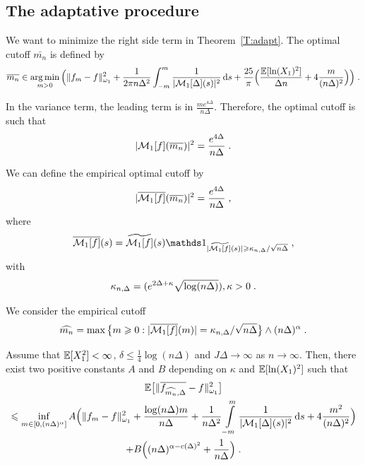 \subsection{The adaptative procedure}
\label{sec:mellin_adaptive}
We want to minimize the right side term in Theorem~\ref{T:adapt}. The optimal cutoff $\bar{m_n}$ is defined by 
\begin{equation*}
    \overline{m_n} \in \operatorname*{arg\,min}_{m > 0} \Big(\|f_m  - f \|_{\omega_1}^2 
    +
    \frac{1}{2\pi n \Delta^2} \int_{-m}^{m}\frac{1}{|\mathcal{M}_1[\Delta](s)|^2}\,\mathrm{d} s  \\
    + \frac{25}{\pi} \Big(\frac{\mathbb{E}[\ln(X_1)^2]}{\Delta n} + 4 \frac{m}{(n \Delta)^{2}} \Big) \Big)
    \; .
\end{equation*}


In the variance term, the leading term is in $\frac{m e^{4\Delta}}{n \Delta}$. Therefore, the optimal cutoff is such that
    \begin{equation*}
        |\mathcal{M}_1[f](\overline{m_n})|^2 = \frac{e^{4\Delta}}{n \Delta}
        \; .
    \end{equation*}

We can define the empirical optimal cutoff by 
    \begin{equation*}
        |\overline{\mathcal{M}_1[f]}(\overline{m_n})|^2 = \frac{e^{4\Delta}}{n \Delta}
        \; ,
    \end{equation*}
where 
\begin{equation*}
    \bar{\Mcal_1[f]}(s) = \tilde{\Mcal_1[f]}(s) \ind{|\tilde{\Mcal_1[f]}(s)| \geq \kappa_{n, \Delta} / \sqrt{n \Delta}}
    \eqfinv
\end{equation*}
with 
\begin{equation*}
    \kappa_{n, \Delta} = (e^{2\Delta + \kappa}\sqrt{\log(n \Delta)}), \kappa > 0
    \; .
\end{equation*}

We consider the empirical cutoff
\begin{equation*}
    \widehat{m_n} = \max \big\{ m \geqslant 0:  |\overline{\mathcal{M}_1[f]}(m)| = \kappa_{n, \Delta} / \sqrt{n \Delta} \big\} \wedge (n \Delta)^\alpha
    \; .
\end{equation*}

\begin{theorem}
\label{T:adapt}
Assume that $\mathbb{E}[X_1^2] < \infty$, $\delta \leq \frac{1}{4} \log(n\Delta)$ and $J\Delta \to \infty$ as $n \to \infty$. Then, 
there exist two positive constants $A$ and $B$ depending on $\kappa$ and $\mathbb{E}[\ln(X_1)^2]$ such that
{\begin{multline*}
    \mathbb{E} \big[ \|\overline{f_{\widehat{m_n}, \Delta}}  - f \|_{\omega_1}^2\big] \\
    \leqslant \inf_{m\in [0,(n \Delta)^\alpha]}A \Big(\| f_m - f \|_{\omega_1}^2 + \frac{\log(n\Delta)m}{n\Delta}
    + \frac{1}{n \Delta^2} \int_{-m}^{m} \limits\frac{1}{|\mathcal{M}_1[\Delta](s)|^2}\,\mathrm{d} s 
    + 4 \frac{m^2}{(n \Delta)^{2}} \Big)
    \\
    + B\Big((n\Delta)^{\alpha - c(\Delta)^2} + \frac{1}{n\Delta}\Big)
    \; .
\end{multline*}}
\end{theorem}

